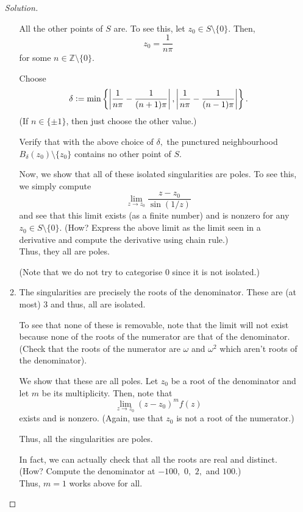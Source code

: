 \documentclass[12pt]{article}
\theoremstyle{definition}
\newenvironment{soln}{\begin{proof}[Solution]}{\end{proof}}
\begin{document}
\begin{enumerate}
\begin{soln}
\begin{enumerate}
			All the other points of $S$ are. To see this, let $z_0 \in S\setminus\{0\}.$ Then, 
			\begin{equation*} 
				z_0 = \dfrac{1}{n\pi}
			\end{equation*}
			for some $n \in \mathbb{Z}\setminus\{0\}.$

			Choose 
			\begin{equation*} 
				\delta \vcentcolon= \min\left\{\left|\dfrac{1}{n\pi} - \dfrac{1}{(n + 1)\pi}\right|, \left|\dfrac{1}{n\pi} - \dfrac{1}{(n - 1)\pi}\right|\right\}.
			\end{equation*}
			(If $n \in \{\pm1\}$, then just choose the other value.)

			Verify that with the above choice of $\delta,$ the punctured neighbourhood $B_\delta(z_0)\setminus\{z_0\}$ contains no other point of $S.$

			Now, we show that all of these isolated singularities are poles. To see this, we simply compute
			\begin{equation*} 
				\lim_{z\to z_0}\dfrac{z - z_0}{\sin(1/z)}
			\end{equation*}
			and see that this limit exists (as a finite number) and is nonzero for any $z_0 \in S\setminus\{0\}.$ (How? Express the above limit as the limit seen in a derivative and compute the derivative using chain rule.) \\
			Thus, they all are poles.

			(Note that we do not try to categorise $0$ since it is not isolated.)
			\item The singularities are precisely the roots of the denominator. These are (at most) $3$ and thus, all are isolated.

			To see that none of these is removable, note that the limit will not exist because none of the roots of the numerator are that of the denominator. (Check that the roots of the numerator are $\omega$ and $\omega^2$ which aren't roots of the denominator).

			We show that these are all poles. Let $z_0$ be a root of the denominator and let $m$ be its multiplicity. Then, note that
			\begin{equation*} 
				\lim_{z\to z_0}(z - z_0)^mf(z)
			\end{equation*}
			exists and is nonzero. (Again, use that $z_0$ is not a root of the numerator.)

			Thus, all the singularities are poles.

			In fact, we can actually check that all the roots are real and distinct. (How? Compute the denominator at $-100,$ $0,$ $2,$ and $100.$) \\
			Thus, $m = 1$ works above for all. \qedhere
		\end{enumerate}
	\end{soln}
\end{enumerate}
\end{document}
